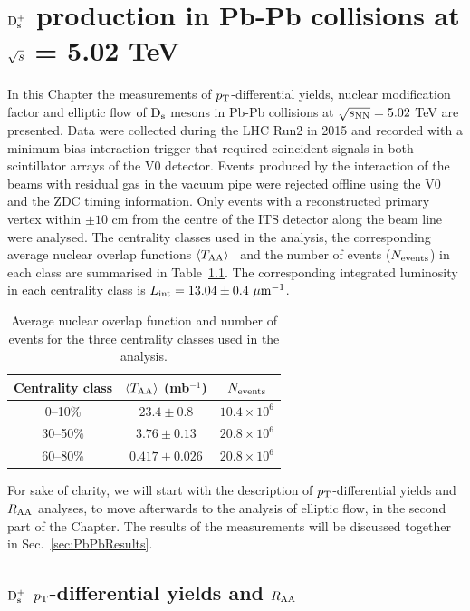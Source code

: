 \chapter{${\rm D_s^+}$ production in Pb-Pb collisions at $\sqrt{s}$ = 5.02 TeV}
\label{chap:PbPb}
In this Chapter the measurements of $p_{\rm T}$-differential yields,
nuclear modification factor and elliptic flow of ${\rm D_s}$ mesons
in Pb-Pb collisions at $\sqrt{s_{\rm NN}} = 5.02$ TeV are presented. Data were
collected during the LHC Run2 in 2015 and recorded with a 
minimum-bias interaction trigger that required coincident signals in 
both scintillator arrays of the V0 detector. Events produced by 
the interaction of the beams with residual gas in the
vacuum pipe were rejected offline using the V0 and the ZDC 
timing information. Only events with a reconstructed primary vertex 
within $\pm 10$ cm from the centre of the ITS detector along
the beam line were analysed. The centrality classes 
used in the analysis, the corresponding 
average nuclear overlap functions $\left\langle T_{\rm AA} \right\rangle$~\cite{ALICE-PUBLIC-2015-008} 
and the number of events ($N_{\rm events}$) in each class 
are summarised in Table~\ref{tab:Nevents}. The corresponding 
integrated luminosity in each centrality class is $L_{\rm int}=13.04\pm0.4~\mathrm{\mu m}^{-1}$.\\
\begin{table}[!h]
	\centering
	\begin{tabular}{ccc}
	\hline
	Centrality class & $\langle T_{\rm AA}\rangle$ (mb$^{-1}$)& $N_{\rm events}$\\
	\hline
	\phantom{0}0--10\% & $23.4\pm0.8$ & $10.4 \times 10^6$ \\
	30--50\% & $3.76\pm0.13$ & $20.8 \times 10^6$\\
	60--80\% & $0.417 \pm 0.026$ & $20.8 \times 10^6$\\
	\hline
	\end{tabular}		
	\caption{Average nuclear overlap function and number of events  for the three centrality classes used in the analysis.}
	\label{tab:Nevents}
\end{table}

For sake of clarity, we will start with the description of $p_{\rm T}$-differential yields and $R_{\rm AA}$ 
analyses, to move afterwards to the analysis of elliptic flow, in the second part of the Chapter. 
The results of the measurements will be discussed together in Sec.~\ref{sec:PbPbResults}.

\section{${\rm D_s^+}$ $p_{\rm T}$-differential yields and $R_{\rm AA}$}
\label{sec:YieldsAndRaa}
